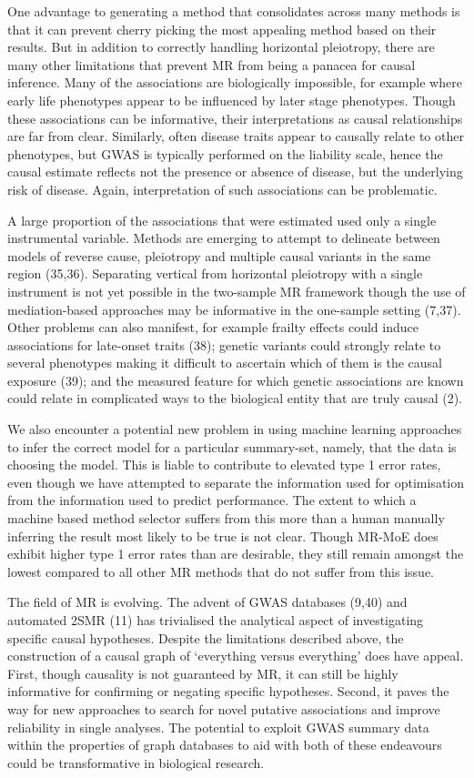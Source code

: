 \documentclass[]{article}
\begin{document}
One advantage to generating a method that consolidates across many
methods is that it can prevent cherry picking the most appealing method
based on their results. But in addition to correctly handling horizontal
pleiotropy, there are many other limitations that prevent MR from being
a panacea for causal inference. Many of the associations are
biologically impossible, for example where early life phenotypes appear
to be influenced by later stage phenotypes. Though these associations
can be informative, their interpretations as causal relationships are
far from clear. Similarly, often disease traits appear to causally
relate to other phenotypes, but GWAS is typically performed on the
liability scale, hence the causal estimate reflects not the presence or
absence of disease, but the underlying risk of disease. Again,
interpretation of such associations can be problematic.

A large proportion of the associations that were estimated used only a
single instrumental variable. Methods are emerging to attempt to
delineate between models of reverse cause, pleiotropy and multiple
causal variants in the same region (35,36). Separating vertical from
horizontal pleiotropy with a single instrument is not yet possible in
the two-sample MR framework though the use of mediation-based approaches
may be informative in the one-sample setting (7,37). Other problems can
also manifest, for example frailty effects could induce associations for
late-onset traits (38); genetic variants could strongly relate to
several phenotypes making it difficult to ascertain which of them is the
causal exposure (39); and the measured feature for which genetic
associations are known could relate in complicated ways to the
biological entity that are truly causal (2).

We also encounter a potential new problem in using machine learning
approaches to infer the correct model for a particular summary-set,
namely, that the data is choosing the model. This is liable to
contribute to elevated type 1 error rates, even though we have attempted
to separate the information used for optimisation from the information
used to predict performance. The extent to which a machine based method
selector suffers from this more than a human manually inferring the
result most likely to be true is not clear. Though MR-MoE does exhibit
higher type 1 error rates than are desirable, they still remain amongst
the lowest compared to all other MR methods that do not suffer from this
issue.

The field of MR is evolving. The advent of GWAS databases (9,40) and
automated 2SMR (11) has trivialised the analytical aspect of
investigating specific causal hypotheses. Despite the limitations
described above, the construction of a causal graph of `everything
versus everything' does have appeal. First, though causality is not
guaranteed by MR, it can still be highly informative for confirming or
negating specific hypotheses. Second, it paves the way for new
approaches to search for novel putative associations and improve
reliability in single analyses. The potential to exploit GWAS summary
data within the properties of graph databases to aid with both of these
endeavours could be transformative in biological research.
\end{document}
